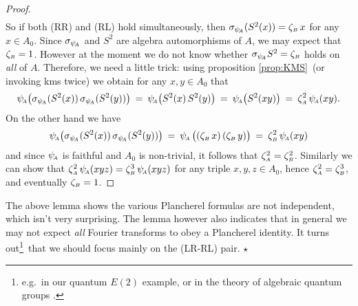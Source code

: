 \begin{proof}
\begin{eqnarray*}
\end{eqnarray*}
So if both ({\scriptsize RR}) and ({\scriptsize RL}) hold simultaneously,
then $\sigma_{\psi_{\!\scriptscriptstyle A}} (S^{2}(x)) = \zeta_{\scriptscriptstyle B} \, x$ for any $x\in A_0$.
Since $\sigma_{\psi_{\!\scriptscriptstyle A}}$ and $S^{2}$ are algebra automorphisms of $A$,
we may expect that $\zeta_{\scriptscriptstyle B}=1$. However at the moment we do not know whether
$\sigma_{\psi_{\!\scriptscriptstyle A}} S^{2} = \zeta_{\scriptscriptstyle B}$ holds on {\em all\/} of $A$.
Therefore, we need a little trick:
using proposition \ref{prop:KMS}\ (or invoking {\sc kms} twice)
we obtain for any $x,y \in A_0$ that
$$  \psiA \! \left( \sigma_{\psiA}(S^{2}(x)) \, \sigma_{\psiA}(S^{2}(y))\vertM \right)
   \:=\: \psiA \! \left(S^{2}(x)\, S^{2}(y) \vertM \right)
   \:=\: \psiA \! \left(S^{2}(xy) \vertM \right)
   \:=\: \zetaA^2 \, \psiA(xy).  $$
On the other hand we have
$$ \psiA \!\left( \sigma_{\psiA}(S^{2}(x))  \, \sigma_{\psiA}(S^{2}(y))\vertM \right)
   \:=\: \psiA\left( (\zetaB\, x) \, (\zetaB\,y) \vertM \right)
   \:=\: \zetaB^2 \, \psiA(xy) $$
and since $\psi_{\!\scriptscriptstyle A}$ is faithful and $A_0$ is non-trivial, it follows that $\zeta_{\scriptscriptstyle A}^2=\zeta_{\scriptscriptstyle B}^2$.
Similarly we can show that $\zeta_{\scriptscriptstyle A}^2 \, \psi_{\!\scriptscriptstyle A}(xyz) = \zeta_{\scriptscriptstyle B}^3 \, \psi_{\!\scriptscriptstyle A}(xyz)$
for any triple $x,y,z \in A_0$, hence $\zeta_{\scriptscriptstyle A}^2=\zeta_{\scriptscriptstyle B}^3$,
and eventually $\zeta_{\scriptscriptstyle B}=1$.
\end{proof}



\begin{remark_sec} \rm
The above lemma shows the various Plancherel formulas are not
independent, which isn't very surprising.
The lemma however also indicates that in general we may not expect
{\em all\/} Fourier transforms to obey a Plancherel identity.
It turns out\footnote{e.g.\ in our quantum $E(2)$ example,
or in the theory of algebraic quantum groups \cite{Fons:AFGD}.}\
that we should focus mainly on the ({\scriptsize LR}-{\scriptsize RL}) pair.
\hfill $\star$
\end{remark_sec}


